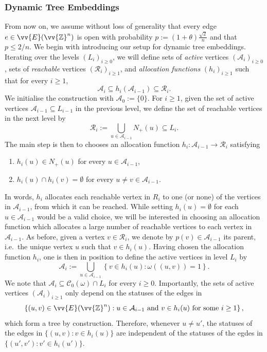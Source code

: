 \documentclass[11pt]{article}
\newcommand{\Z}{\mathbb{Z}}
\newcommand{\A}{\mathcal{A}}
\theoremstyle{remark}
\begin{document}
\subsubsection{Dynamic Tree Embeddings}

From now on, we assume without loss of generality that every edge $e \in \vv{E}(\vv{\Z}^n)$ is open with probability $p := (1 + \theta)\frac{\sqrt{2}}{n}$ and that $p \le 2/n$. 
We begin with introducing our setup for dynamic tree embeddings. Iterating over the levels $(L_i)_{i\ge 0}$, we will define sets of \emph{active} vertices $(\A_i)_{i\ge 0}$, sets of \emph{reachable} vertices $(\mathcal R_i)_{i\ge 1}$, and \emph{allocation functions} $(h_i)_{i\ge 1}$ such that for every $i\ge 1$,
\begin{equation}
    \A_i \subseteq h_i(\A_{i-1})\subseteq \mathcal R_i .
\end{equation}
We initialise the construction with $\A_0 := \{0\}$. For $i\ge 1$, given the set of active vertices $\A_{i-1} \subseteq L_{i-1}$ in the previous level, we define the set of reachable vertices in the next level by 
\begin{equation}
    \mathcal R_i := \bigcup_{u \in \A_{i-1}} N_+(u) \subseteq L_i .
\end{equation}
The main step is then to chooses an allocation function $h_i : \A_{i-1} \to \mathcal R_i$ satisfying 
\begin{enumerate}
    \item[(i)] $h_i(u) \in N_+(u)$ for every $u \in \A_{i-1}$,
    \item[(ii)] $h_i(u) \cap h_i(v) = \emptyset$ for every $u \neq v \in \A_{i-1}$.
\end{enumerate}
In words, $h_i$ allocates each reachable vertex in $R_i$ to one (or none) of the vertices in $\A_{i-1}$, from which it can be reached. While setting $h_i(u)=\emptyset$ for each $u \in \A_{i-1}$ would be a valid choice, we will be interested in choosing an allocation function which allocates a large number of reachable vertices to each vertex in $\A_{i-1}$. 
As before, given a vertex $v \in \mathcal R_i$, we denote by $p(v) \in \A_{i-1}$ its parent, i.e.\ the unique vertex $u$ such that $v \in h_i(u)$.
Having chosen the allocation function $h_i$, one is then in position to define the active vertices in level $L_i$ by 
\begin{equation}
    \A_i := \bigcup_{u \in \A_{i-1}} \left\{ v \in h_i(u) : \omega((u,v)) = 1 \right\}. 
\end{equation}
We note that $\A_i \subseteq \mathcal C_0(\omega) \cap L_i$ for every $i\ge 0$. Importantly, the sets of active vertices $(\A_i)_{i\ge 1}$ only depend on the statuses of the edges in
\begin{equation}
    \left\{(u,v) \in \vv{E}(\vv{\Z}^n) : u \in \A_{i-1}\ \text{and}\ v \in h_i(u)\ \text{for some}\ i\ge 1\right\},
\end{equation}
which form a tree by construction. Therefore, whenever $u \neq u'$, the statuses of the edges in $\{(u,v): v \in h_i(u)\}$ are independent of the statuses of the egdes in $\{(u',v'): v' \in h_i(u')\}$. 
\end{document}
